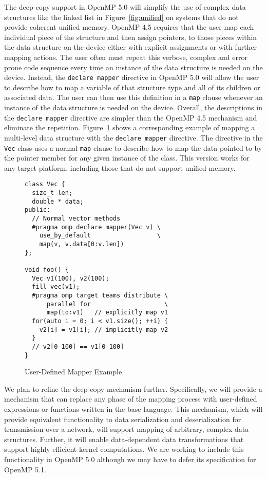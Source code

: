 The deep-copy support in OpenMP 5.0 will simplify the use of complex data
structures like the linked list in Figure~\ref{fig:unified} on systems that 
do not provide coherent unified memory. OpenMP 4.5 requires that the user map 
each individual piece of the structure and then assign pointers, to those 
pieces within the data structure on the device either with explicit 
assignments or with further mapping actions. The user often must repeat this 
verbose, complex and error prone code sequence every time an instance of the 
data structure is needed on the device. Instead, the \texttt{declare mapper}
directive in OpenMP 5.0 will allow the user to describe how to map a variable 
of that structure type and all of its children or associated data. The user
can then use this definition in a \texttt{map} clause whenever an instance 
of the data structure is needed on the device. Overall, the descriptions in
the \texttt{declare mapper} directive are simpler than the OpenMP 4.5
mechanism and eliminate the repetition. Figure~\ref{fig:mapper} shows a
corresponding example of mapping a multi-level data structure with the
\texttt{declare mapper} directive.  The directive in the \texttt{Vec} class uses
a normal \texttt{map} clause to describe how to map the data pointed to by the
pointer member for any given instance of the class.  This version works for any
target platform, including those that do not support unified memory.

\begin{figure}
\begin{verbatim}
class Vec {
  size_t len;
  double * data;
public:
  // Normal vector methods
  #pragma omp declare mapper(Vec v) \
    use_by_default                  \
    map(v, v.data[0:v.len])
};

void foo() {
  Vec v1(100), v2(100);
  fill_vec(v1);
  #pragma omp target teams distribute \
      parallel for                    \
      map(to:v1)   // explicitly map v1
  for(auto i = 0; i < v1.size(); ++i) { 
    v2[i] = v1[i]; // implicitly map v2
  }
  // v2[0-100] == v1[0-100]
}
\end{verbatim}
\caption{User-Defined Mapper Example\label{fig:mapper}}
\end{figure}

We plan to refine the deep-copy mechanism further. Specifically, we will 
provide a mechanism that can replace any phase of the mapping process with 
user-defined expressions or functions written in the base language. This 
mechanism, which will provide equivalent functionality to data  serialization 
and deserialization for transmission over a network,  will support mapping 
of arbitrary, complex data structures. Further, it will enable data-dependent 
data transformations that support highly efficient kernel computations. We
are working to include this functionality in OpenMP 5.0 although we may
have to defer its specification for OpenMP 5.1.




